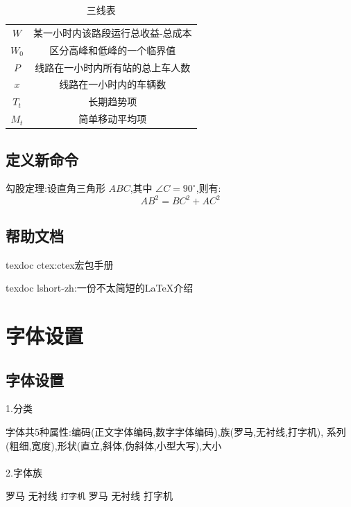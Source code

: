\documentclass[12pt]{ctexart}
\begin{document}
\begin{table}[H]
	\centering
	\caption{三线表}
	\begin{tabular}{cc}
		\toprule[1.5pt]
		\makebox[0.3\textwidth][c]{符号}	&  \makebox[0.4\textwidth][c]{意义} \\
		\midrule[1pt]
		$ W $	    	& 某一小时内该路段运行总收益-总成本   \\ 
		$ W_0 $	    	& 区分高峰和低峰的一个临界值  \\ 
		$ P $	    	& 线路在一小时内所有站的总上车人数 \\ 
		$ x $	    	& 线路在一小时内的车辆数 \\  
		$ T_t $	    	& 长期趋势项 \\ 
		$ M_t $	    	& 简单移动平均项 \\ 
		\bottomrule[1.5pt]
	\end{tabular}\label{b2}
\end{table}

\subsection{定义新命令}
\newcommand\degree{^\circ}
勾股定理:设直角三角形 $ABC$,其中 $\angle C=90 \degree$,则有:
$$AB^2=BC^2+AC^2$$

\subsection{帮助文档}
texdoc ctex:ctex宏包手册{\par}
texdoc lshort-zh:一份不太简短的{\LaTeX}介绍


\section{字体设置}
\subsection{字体设置}

\noindent

1.分类
\par 字体共5种属性:编码(正文字体编码,数字字体编码),族(罗马,无衬线,打字机),
系列(粗细,宽度),形状(直立,斜体,伪斜体,小型大写),大小 \\\\

2.字体族
\par \textrm{罗马} \textsf{无衬线} \texttt{打字机} %
{\rmfamily 罗马} {\sffamily 无衬线} {\ttfamily 打字机} \\\\ %
\end{document}
